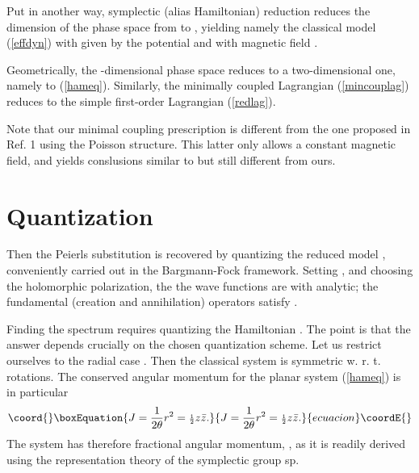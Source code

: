 \documentclass[a4paper,12pt]{article}
\providecommand\half{{\scriptstyle{\frac{1}{2}}}}
\begin{document}
Put in another way, symplectic\cite{DH,SSD}
(alias Hamiltonian\cite{FaJa}) reduction reduces
 the dimension of the phase space from \coordHE{} to 
\coordHE{}, yielding namely the   
classical model (\ref{effdyn})
with \coordHE{} given by the potential \coordHE{} and with
magnetic field \coordHE{}. 


Geometrically, the \coordHE{}-dimensional phase space reduces to a 
two-dimensional one, namely to (\ref{hameq}).
Similarly, the minimally coupled Lagrangian (\ref{mincouplag})
reduces to the simple first-order Lagrangian (\ref{redlag}).

Note that our 
minimal coupling prescription is different from the one proposed
in Ref. 1 using the Poisson structure. 
This latter only allows a
constant magnetic field, and yields  conslusions
similar to but still different from ours.

\section{Quantization}

Then the Peierls substitution is recovered
by quantizing the reduced model \cite{DJT,DH},
 conveniently carried out in the Bargmann-Fock
framework. Setting \coordHE{}, and
choosing the holomorphic polarization, the
the wave functions are \coordHE{} with \coordHE{}
analytic; the fundamental (creation and annihilation) operators 
\coordHE{} 
satisfy \coordHE{}.

Finding the spectrum requires quantizing  the Hamiltonian
 \coordHE{}. 
The point is that  the answer depends crucially on the chosen
quantization scheme.
Let us restrict ourselves to the radial case \coordHE{}.
Then the classical system is symmetric w. r. t. rotations.
The conserved angular momentum for the planar system
(\ref{hameq}) is in particular
\begin{equation}\coord{}\boxEquation{
J=\frac{1}{2\theta} r^2=\half z\bar{z}.
\label{angmom}
}{
J=\frac{1}{2\theta} r^2=\half z\bar{z}.
}{ecuacion}\coordE{}\end{equation}
The system has therefore fractional angular momentum,   
\coordHE{}, as it is readily derived\cite{HMC}
using the representation theory of the symplectic group sp\coordHE{}.
\end{document}
